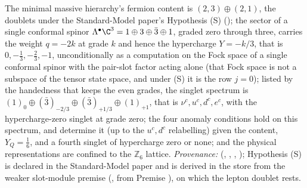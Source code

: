 The minimal massive hierarchy's fermion content is $(2,3) \oplus (2,1)$, the doublets under the Standard-Model paper's Hypothesis (S) (); the sector of a single conformal spinor $\Lambda^{\bullet}\C^{3} = 1 \oplus 3 \oplus \bar{3} \oplus 1$, graded zero through three, carries the weight $q = -2k$ at grade $k$ and hence the hypercharge $Y = -k/3$, that is $0, -\tfrac13, -\tfrac23, -1$, unconditionally as a computation on the Fock space of a single conformal spinor with the pair-slot factor acting alone (that Fock space is not a subspace of the tensor state space, and under (S) it is the row $j = 0$); listed by the handedness that keeps the even grades, the singlet spectrum is $(1)_{0} \oplus (\bar{3})_{-2/3} \oplus (\bar{3})_{+1/3} \oplus (1)_{+1}$, that is $\nu^{c}, u^{c}, d^{c}, e^{c}$, with the hypercharge-zero singlet at grade zero; the four anomaly conditions hold on this spectrum, and determine it (up to the $u^{c}, d^{c}$ relabelling) given the content, $Y_{Q} = \tfrac16$, and a fourth singlet of hypercharge zero or none; and the physical representations are confined to the $\mathbb{Z}_{6}$ lattice. \emph{Provenance:} \cite[Prop.~5.1, Prop.~5.3, Thm.~5.5, Thm.~4.2]{ButlerT12} (, , , ); Hypothesis (S) is declared in the Standard-Model paper and is derived in the store from the weaker slot-module premise (, from Premise ), on which the lepton doublet rests.
